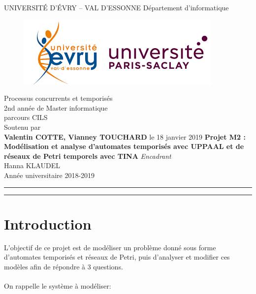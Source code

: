 \documentclass[11pt, a4paper]{article} %
\begin{document}

\thispagestyle{empty}
\begin{center}
  {\LARGE UNIVERSITÉ D'ÉVRY -- VAL D'ESSONNE}
  \vskip 3mm
  {\LARGE Département d'informatique}\\
  \vskip 3mm
  \begin{figure}[h]
    \begin{center}
      \includegraphics[scale=1]{logoUEVE.png}
		\end{center}
  \end{figure}
  \vskip 0cm
  {\LARGE Processus concurrents et temporisés}\\
  \vskip 3mm
  2nd année de Master informatique\\
  parcours CILS\\  
	\vskip 1cm
  Soutenu par\\
  \vskip 3mm {\LARGE {\bf Valentin COTTE, Vianney TOUCHARD}} 
  \vskip 3mm le 18 janvier 2019 
  \vfill {\huge {\bf Projet M2 : Modélisation et analyse d'automates temporisés avec UPPAAL et de réseaux de Petri temporels avec TINA}} \vfill
	\vskip 3mm
	\emph{Encadrant}\\
  Hanna KLAUDEL \\
  \vskip 3cm Année universitaire 2018-2019
\end{center}

\clearpage


\hrule\medskip

\begin{center}
  \tableofcontents
\end{center}

\medskip\hrule\bigskip\bigskip

\section{Introduction}
\label{sec:Intro}

L'objectif de ce projet est de modéliser un problème donné sous forme d'automates temporisés et réseaux de Petri, puis d'analyser et modifier ces modèles afin de répondre à 3 questions.\\
\\
On rappelle le système à modéliser:\\
\end{document}
